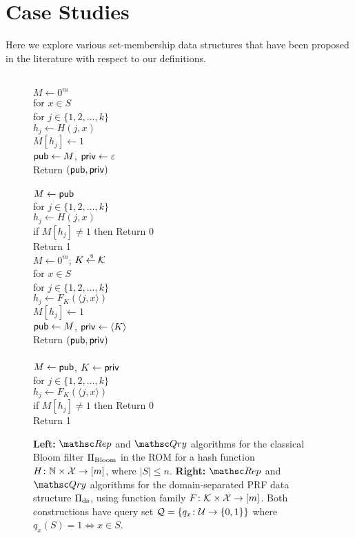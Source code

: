 \section{Case Studies}\label{sec:case_studies}
Here we explore various set-membership data structures that have been proposed
in the literature with respect to our definitions.


\begin{figure}[tp]
\centering
{}
{
\\
$M \gets 0^m$\\
for $x \in S$\\
\nudge for $j \in \{1,2,\ldots,k\}$\\
\nudge\nudge $h_j \gets H(j,x)$\\
\nudge\nudge $M[h_j] \gets 1$\\
${\sf pub} \gets M$, ${\sf priv} \gets \varepsilon$\\
Return $({\sf pub},{\sf priv})$\\

\medskip
{}\\
$M\gets{\sf pub}$\\
for $j \in \{1,2,\ldots,k\}$\\
\nudge $h_j \gets H(j,x)$\\
\nudge if $M[h_j] \neq 1$ then Return 0\\
Return 1
}
{
\\
$M \gets 0^m$; $K {\:\stackrel{{\scriptscriptstyle \hspace{0.2em}\$}} {\leftarrow}\:} {\cal K}$\\
for $x \in S$\\
\nudge for $j \in \{1,2,\ldots,k\}$\\
\nudge\nudge $h_j \gets F_{K}(\langle j,x \rangle) $\\
\nudge\nudge $M[h_j] \gets 1$\\
${\sf pub} \gets M$, ${\sf priv} \gets \langle K \rangle$\\
Return $({\sf pub},{\sf priv})$\\

\medskip
{}\\
$M\gets{\sf pub}$, $K \gets {\sf priv}$\\
for $j \in \{1,2,\ldots,k\}$\\
\nudge $h_j \gets F_{K}(\langle j,x \rangle) $\\
\nudge if $M[h_j] \neq 1$ then Return 0\\
Return 1 } \caption{{\bf Left:} $\Rep$ and $\Qry$ algorithms for the
classical Bloom
  filter $\Pi_{\mathrm{Bloom}}$ in the ROM for a hash function $H\colon \mathbb{N} \times
  {\cal X} \to [m]$, where $|S| \leq n$. 
  {\bf Right:} $\Rep$ and $\Qry$
  algorithms for the domain-separated PRF data structure
  $\Pi_{\mathrm{ds}}$, using function family $F \colon
  {\cal K} \times {\cal X} \to [m]$.  Both constructions have query set ${\cal Q}=\{q_x\colon
  {\cal U} \to \{0,1\}\}$ where $q_x(S)=1 \Leftrightarrow x \in S$.  }
\label{fig:bf-and-ds}
\end{figure}

